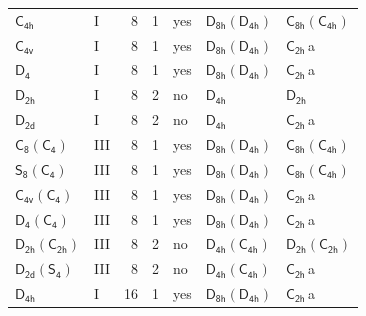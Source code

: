 \documentclass[10pt,a4paper]{article}
\numberwithin{equation}{section}
\newcommand{\grp}[1]{\mathsf{#1}}
\newcommand{\clsletter}[1]{\,{\scriptsize\color{black!55}#1}}
\begin{document}
{\begin{longtable}{@{}llrrlll@{}}
\href{../../../rotation/data/pdf/C4h.pdf}{$\grp{C_{4h}}$} & I & 8 & 1 & yes & \href{D8h-D4h.pdf}{$\grp{D_{8h}}(\grp{D_{4h}})$} & \href{C8h-C4h.pdf}{$\grp{C_{8h}}(\grp{C_{4h}})$}\\
\href{../../../rotation/data/pdf/C4v.pdf}{$\grp{C_{4v}}$} & I & 8 & 1 & yes & \href{D8h-D4h.pdf}{$\grp{D_{8h}}(\grp{D_{4h}})$} & \href{../../../rotation/data/pdf/C2h.pdf}{$\grp{C_{2h}}$}\clsletter{a}\\
\href{../../../rotation/data/pdf/D4.pdf}{$\grp{D_{4}}$} & I & 8 & 1 & yes & \href{D8h-D4h.pdf}{$\grp{D_{8h}}(\grp{D_{4h}})$} & \href{../../../rotation/data/pdf/C2h.pdf}{$\grp{C_{2h}}$}\clsletter{a}\\
\href{../../../rotation/data/pdf/D2h.pdf}{$\grp{D_{2h}}$} & I & 8 & 2 & no & \href{../../../rotation/data/pdf/D4h.pdf}{$\grp{D_{4h}}$} & \href{../../../rotation/data/pdf/D2h.pdf}{$\grp{D_{2h}}$}\\
\href{../../../rotation/data/pdf/D2d.pdf}{$\grp{D_{2d}}$} & I & 8 & 2 & no & \href{../../../rotation/data/pdf/D4h.pdf}{$\grp{D_{4h}}$} & \href{../../../rotation/data/pdf/C2h.pdf}{$\grp{C_{2h}}$}\clsletter{a}\\
\href{C8-C4.pdf}{$\grp{C_{8}}(\grp{C_{4}})$} & III & 8 & 1 & yes & \href{D8h-D4h.pdf}{$\grp{D_{8h}}(\grp{D_{4h}})$} & \href{C8h-C4h.pdf}{$\grp{C_{8h}}(\grp{C_{4h}})$}\\
\href{S8-C4.pdf}{$\grp{S_{8}}(\grp{C_{4}})$} & III & 8 & 1 & yes & \href{D8h-D4h.pdf}{$\grp{D_{8h}}(\grp{D_{4h}})$} & \href{C8h-C4h.pdf}{$\grp{C_{8h}}(\grp{C_{4h}})$}\\
\href{C4v-C4.pdf}{$\grp{C_{4v}}(\grp{C_{4}})$} & III & 8 & 1 & yes & \href{D8h-D4h.pdf}{$\grp{D_{8h}}(\grp{D_{4h}})$} & \href{../../../rotation/data/pdf/C2h.pdf}{$\grp{C_{2h}}$}\clsletter{a}\\
\href{D4-C4.pdf}{$\grp{D_{4}}(\grp{C_{4}})$} & III & 8 & 1 & yes & \href{D8h-D4h.pdf}{$\grp{D_{8h}}(\grp{D_{4h}})$} & \href{../../../rotation/data/pdf/C2h.pdf}{$\grp{C_{2h}}$}\clsletter{a}\\
\href{D2h-C2h.pdf}{$\grp{D_{2h}}(\grp{C_{2h}})$} & III & 8 & 2 & no & \href{D4h-C4h.pdf}{$\grp{D_{4h}}(\grp{C_{4h}})$} & \href{D2h-C2h.pdf}{$\grp{D_{2h}}(\grp{C_{2h}})$}\\
\href{D2d-S4.pdf}{$\grp{D_{2d}}(\grp{S_{4}})$} & III & 8 & 2 & no & \href{D4h-C4h.pdf}{$\grp{D_{4h}}(\grp{C_{4h}})$} & \href{../../../rotation/data/pdf/C2h.pdf}{$\grp{C_{2h}}$}\clsletter{a}\\
\href{../../../rotation/data/pdf/D4h.pdf}{$\grp{D_{4h}}$} & I & 16 & 1 & yes & \href{D8h-D4h.pdf}{$\grp{D_{8h}}(\grp{D_{4h}})$} & \href{../../../rotation/data/pdf/C2h.pdf}{$\grp{C_{2h}}$}\clsletter{a}\\

\end{longtable}}
\end{document}
